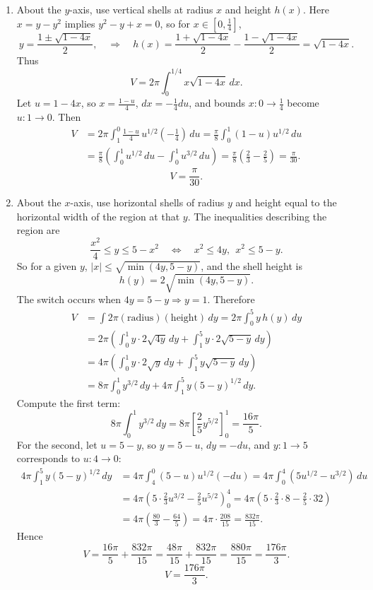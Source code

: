 \documentclass[12pt]{article}
\begin{document}
\begin{enumerate}[label=(\alph*)]
\item About the \(y\)-axis, use vertical shells at radius \(x\) and height \(h(x)\).
Here \(x=y-y^2\) implies \(y^2-y+x=0\), so for \(x\in[0,\frac14]\),
\[
y=\frac{1\pm\sqrt{1-4x}}{2},
\quad\Rightarrow\quad
h(x)=\frac{1+\sqrt{1-4x}}{2}-\frac{1-\sqrt{1-4x}}{2}=\sqrt{1-4x}.
\]
Thus
\[
V=2\pi\int_{0}^{1/4} x\sqrt{1-4x}\,dx.
\]
Let \(u=1-4x\), so \(x=\frac{1-u}{4}\), \(dx=-\frac14 du\), and bounds \(x:0\to\frac14\) become \(u:1\to 0\). Then
\begin{align*}
V
&=2\pi\int_{1}^{0}\frac{1-u}{4}\,u^{1/2}\left(-\frac14\right)\,du
=\frac{\pi}{8}\int_{0}^{1}(1-u)u^{1/2}\,du\\
&=\frac{\pi}{8}\left(\int_{0}^{1}u^{1/2}\,du-\int_{0}^{1}u^{3/2}\,du\right)
=\frac{\pi}{8}\left(\frac{2}{3}-\frac{2}{5}\right)
=\frac{\pi}{30}.
\end{align*}
\[
\boxed{V=\frac{\pi}{30}.}
\]

\item About the \(x\)-axis, use horizontal shells of radius \(y\) and height equal to the horizontal width of the region at that \(y\).
The inequalities describing the region are
\[
\frac{x^2}{4}\le y \le 5-x^2
\quad\Longleftrightarrow\quad
x^2\le 4y,\ \ x^2\le 5-y.
\]
So for a given \(y\), \(|x|\le \sqrt{\min(4y,5-y)}\), and the shell height is
\[
h(y)=2\sqrt{\min(4y,5-y)}.
\]
The switch occurs when \(4y=5-y\Rightarrow y=1\). Therefore
\begin{align*}
V
&=\int 2\pi(\text{radius})(\text{height})\,dy
=2\pi\int_{0}^{5} y\,h(y)\,dy\\
&=2\pi\left(\int_{0}^{1} y\cdot 2\sqrt{4y}\,dy + \int_{1}^{5} y\cdot 2\sqrt{5-y}\,dy\right)\\
&=4\pi\left(\int_{0}^{1} y\cdot 2\sqrt{y}\,dy + \int_{1}^{5} y\sqrt{5-y}\,dy\right)\\
&=8\pi\int_{0}^{1} y^{3/2}\,dy + 4\pi\int_{1}^{5} y(5-y)^{1/2}\,dy.
\end{align*}
Compute the first term:
\[
8\pi\int_{0}^{1} y^{3/2}\,dy
=8\pi\left[\frac{2}{5}y^{5/2}\right]_{0}^{1}
=\frac{16\pi}{5}.
\]
For the second, let \(u=5-y\), so \(y=5-u\), \(dy=-du\), and \(y:1\to 5\) corresponds to \(u:4\to 0\):
\begin{align*}
4\pi\int_{1}^{5} y(5-y)^{1/2}\,dy
&=4\pi\int_{4}^{0} (5-u)u^{1/2}(-du)
=4\pi\int_{0}^{4} (5u^{1/2}-u^{3/2})\,du\\
&=4\pi\left(5\cdot \frac{2}{3}u^{3/2}-\frac{2}{5}u^{5/2}\right)_{0}^{4}
=4\pi\left(5\cdot\frac{2}{3}\cdot 8-\frac{2}{5}\cdot 32\right)\\
&=4\pi\left(\frac{80}{3}-\frac{64}{5}\right)
=4\pi\cdot \frac{208}{15}
=\frac{832\pi}{15}.
\end{align*}
Hence
\[
V=\frac{16\pi}{5}+\frac{832\pi}{15}
=\frac{48\pi}{15}+\frac{832\pi}{15}
=\frac{880\pi}{15}
=\frac{176\pi}{3}.
\]
\[
\boxed{V=\frac{176\pi}{3}.}
\]


\end{enumerate}
\end{document}

